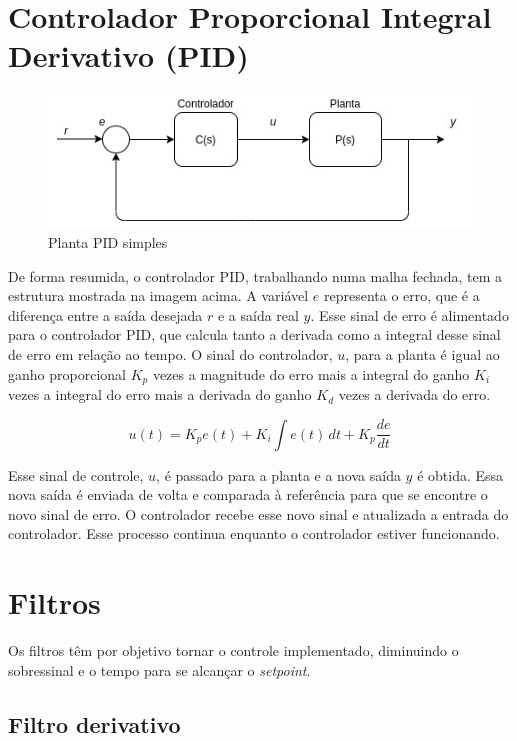 \documentclass[
	12pt,				%
	openany,			%
	oneside,			%
	a4paper,			%
	english,			%
	french,				%
	spanish,			%
	brazil,				%
	]{abntex2}
\begin{document}
{\section{Controlador Proporcional Integral Derivativo (PID)}

\begin{figure}[h]
	\centering
	\includegraphics[scale=0.70]{planta.jpg}
	\caption{Planta PID simples}
\end{figure}

De forma resumida, o controlador PID, trabalhando numa malha fechada, tem a estrutura mostrada na imagem acima. A variável $e$ representa o erro, que é a diferença entre a saída desejada $r$ e a saída real $y$. Esse sinal de erro é alimentado para o controlador PID, que calcula tanto a derivada como a integral desse sinal de erro em relação ao tempo. O sinal do controlador, $u$, para a planta é igual ao ganho proporcional $K_p$ vezes a magnitude do erro mais a integral do ganho $K_i$ vezes a integral do erro mais a derivada do ganho $K_d$ vezes a derivada do erro.

\begin{equation}
u(t) = K_pe(t) + K_i\int e(t)\,dt + K_p\frac{de}{dt}
\end{equation}

Esse sinal de controle, $u$, é passado para a planta e a nova saída $y$ é obtida. Essa nova saída é enviada de volta e comparada à referência para que se encontre o novo sinal de erro. O controlador recebe esse novo sinal e atualizada a entrada do controlador. Esse processo continua enquanto o controlador estiver funcionando.

\section{Filtros}

Os filtros têm por objetivo tornar o controle implementado, diminuindo o sobressinal e o tempo para se alcançar o \textit{setpoint}.

\subsection{Filtro derivativo}

}
\end{document}
